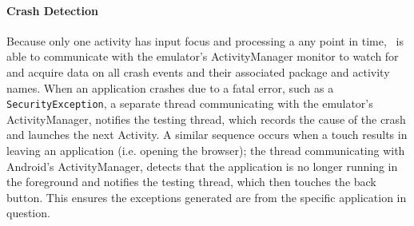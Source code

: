 \paragraph{\bfseries Crash Detection}
Because only one activity has input focus and processing a any point in time, \toolname\ is able to communicate with the emulator's ActivityManager monitor to watch for and acquire data on all crash events and their associated package and activity names.  When an application crashes due to a fatal error, such as a \texttt{SecurityException}, a separate thread communicating with the emulator's ActivityManager, notifies the testing thread, which records the cause of the crash and launches the next Activity.  A similar sequence occurs when a touch results in leaving an application (i.e. opening the browser); the thread communicating with Android's ActivityManager, detects that the application is no longer running in the foreground and notifies the testing thread, which then touches the back button.  This ensures the exceptions generated are from the specific application in question.
